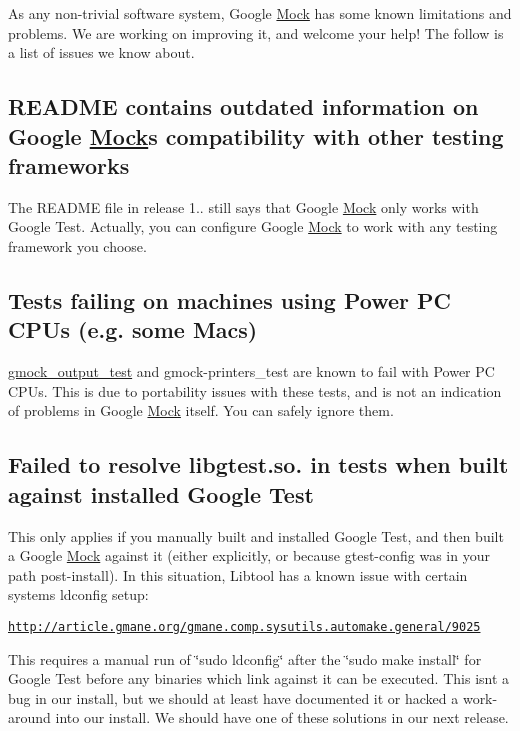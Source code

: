 As any non-\/trivial software system, Google \hyperlink{classMock}{Mock} has some known limitations and problems. We are working on improving it, and welcome your help! The follow is a list of issues we know about.

\subsection*{R\+E\+A\+D\+ME contains outdated information on Google \hyperlink{classMock}{Mock}\textquotesingle{}s compatibility with other testing frameworks}

The {\ttfamily R\+E\+A\+D\+ME} file in release 1.. still says that Google \hyperlink{classMock}{Mock} only works with Google Test. Actually, you can configure Google \hyperlink{classMock}{Mock} to work with any testing framework you choose.

\subsection*{Tests failing on machines using Power PC C\+P\+Us (e.\+g. some Macs)}

{\ttfamily \hyperlink{namespacegmock__output__test}{gmock\+\_\+output\+\_\+test}} and {\ttfamily gmock-\/printers\+\_\+test} are known to fail with Power PC C\+P\+Us. This is due to portability issues with these tests, and is not an indication of problems in Google \hyperlink{classMock}{Mock} itself. You can safely ignore them.

\subsection*{Failed to resolve libgtest.\+so. in tests when built against installed Google Test}

This only applies if you manually built and installed Google Test, and then built a Google \hyperlink{classMock}{Mock} against it (either explicitly, or because gtest-\/config was in your path post-\/install). In this situation, Libtool has a known issue with certain systems\textquotesingle{} ldconfig setup\+:

\href{http://article.gmane.org/gmane.comp.sysutils.automake.general/9025}{\tt http\+://article.\+gmane.\+org/gmane.\+comp.\+sysutils.\+automake.\+general/9025}

This requires a manual run of \char`\"{}sudo ldconfig\char`\"{} after the \char`\"{}sudo make install\char`\"{} for Google Test before any binaries which link against it can be executed. This isn\textquotesingle{}t a bug in our install, but we should at least have documented it or hacked a work-\/around into our install. We should have one of these solutions in our next release. 